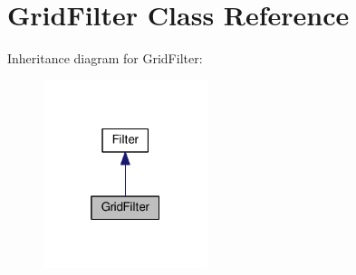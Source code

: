 \hypertarget{classModel_1_1GridFilter}{}\section{Grid\+Filter Class Reference}
\label{classModel_1_1GridFilter}


Inheritance diagram for Grid\+Filter\+:
\nopagebreak
\begin{figure}[H]
\begin{center}
\leavevmode
\includegraphics[width=136pt]{classModel_1_1GridFilter__inherit__graph}
\end{center}
\end{figure}
